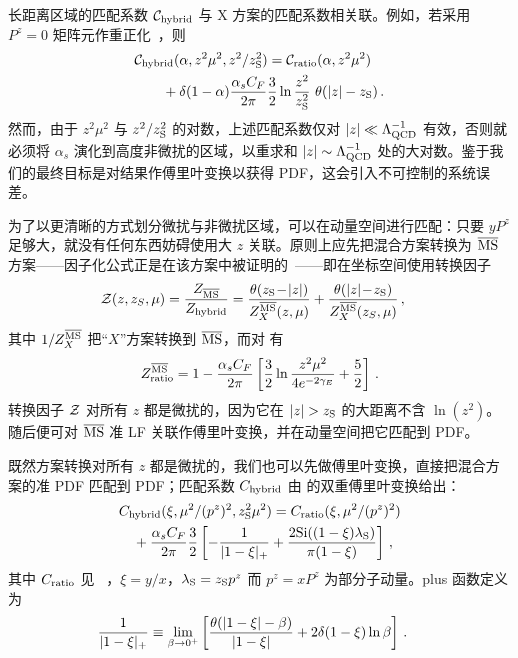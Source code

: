 长距离区域的匹配系数 ${\cal C}_{\rm hybrid}$ 与 X 方案的匹配系数相关联。例如，若采用 $P^z=0$ 矩阵元作重正化~\cite{Zhang:2018ggy,Radyushkin:2017lvu,Izubuchi:2018srq}，则
\begin{align}\label{eq:hybridm1}
&{\cal C}_{\rm hybrid}(\alpha, z^2\mu^2, z^2/z_{\rm S}^2) = {\cal C}_{\rm ratio}(\alpha, z^2\mu^2) \nonumber\\
&\qquad + \delta(1-\alpha){\alpha_sC_F\over 2\pi}{3\over 2} \ln {z^2\over z_{\rm S}^2}\ \theta(|z|-z_{\rm S})\,.
\end{align}
然而，由于 $z^2\mu^2$ 与 $z^2/z_{\rm S}^2$ 的对数，上述匹配系数仅对 $|z| \ll \Lambda_{\rm QCD}^{-1}$ 有效，否则就必须将 $\alpha_s$ 演化到高度非微扰的区域，以重求和 $|z|\sim \Lambda_{\rm QCD}^{-1}$ 处的大对数。鉴于我们的最终目标是对结果作傅里叶变换以获得 PDF，这会引入不可控制的系统误差。

为了以更清晰的方式划分微扰与非微扰区域，可以在动量空间进行匹配：只要 $yP^z$ 足够大，就没有任何东西妨碍使用大 $z$ 关联。原则上应先把混合方案转换为 ${\overline{\rm MS}}$ 方案——因子化公式正是在该方案中被证明的~\cite{Ma:2014jla,Ji:2020ect}——即在坐标空间使用转换因子
\begin{align}\label{eq:hybrid3}
    {\cal Z}(z,z_S,\mu) & = {Z_{{\overline{\rm MS}}}\over Z_{\rm hybrid}} =\frac{\theta(z_{\rm S}\!-\!|z|)}{Z^{\overline{\rm MS}}_{X}(z,\mu)}
    +\frac{\theta(|z|\!-\! z_{\rm S})}{Z^{\overline{\rm MS}}_{X}(z_S,\mu)}\,,
\end{align}
其中 $1/Z^{\overline{\rm MS}}_{X}$ 把``$X$''方案转换到 ${\overline{\rm MS}}$，而对  有
\begin{align}\label{eq:zmsr}
    Z^{\overline{\rm MS}}_{\rm ratio} = 1 - {\alpha_sC_F\over 2\pi}\left[{3\over 2}\ln{z^2\mu^2\over 4e^{-2\gamma_E}}+ {5\over2}\right]\,.
\end{align}
转换因子 ${\cal Z}$ 对所有 $z$ 都是微扰的，因为它在 $|z|>z_{\rm S}$ 的大距离不含 $\ln(z^2)$。随后便可对 ${\overline{\rm MS}}$ 准 LF 关联作傅里叶变换，并在动量空间把它匹配到 PDF。

既然方案转换对所有 $z$ 都是微扰的，我们也可以先做傅里叶变换，直接把混合方案的准 PDF 匹配到 PDF；匹配系数 $C_{\rm hybrid}$ 由  的双重傅里叶变换给出：
\begin{align}\label{eq:hybridm2}
&C_{\rm hybrid}(\xi, \mu^2/(p^z)^2, z_{\rm S}^2\mu^2) = C_{\rm ratio}(\xi, \mu^2/(p^z)^2) \nonumber\\
&\quad+{\alpha_sC_F\over 2\pi}{3\over 2} \left[-{1\over |1-\xi|_+}+ \frac{2 \text{Si}((1-\xi) \lambda_{\rm S})}{\pi  (1-\xi)} \right]\,,
\end{align}
其中 $C_{\rm ratio}$ 见 ~\cite{Izubuchi:2018srq}，$\xi=y/x$，$\lambda_{\rm S}=z_{\rm S}p^z$ 而 $p^z=xP^z$ 为部分子动量。plus 函数定义为
\begin{align}
	{1\over |1-\xi|_+} &\equiv \lim_{\beta\to0^+}\left[ {\theta(|1-\xi|-\beta)\over |1-\xi|} + 2\delta(1-\xi)\ln\beta\right] \,.
\end{align}

